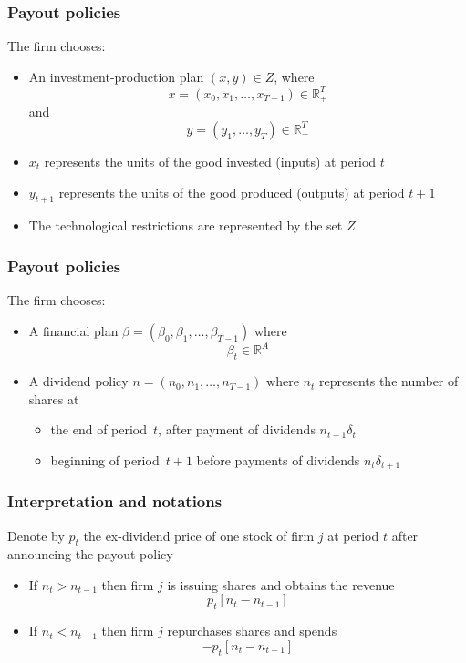 \documentclass[blue]{beamer}
\def\R{\mathbb{R}}
\theoremstyle{definition}
\theoremstyle{example}
\begin{document}

\begin{frame}\frametitle{Payout policies}
The firm chooses:
    \begin{itemize}
    \item An investment-production plan $(x,y) \in Z$, where
    \[
    x=(x_0,x_1,\ldots,x_{T-1}) \in \R_+^T
    \]
    and
    \[
    y=(y_1,\ldots,y_{T}) \in \R_+^T
    \]
    \item $x_t$ represents the units of the good invested (inputs) at period $t$
    \item $y_{t+1}$ represents the units of the good produced (outputs) at period $t+1$
    \item The technological restrictions are represented by the set $Z$
    \end{itemize}

\end{frame}


\begin{frame}\frametitle{Payout policies}
The firm chooses:
    \begin{itemize}
    \item A financial plan $\beta=(\beta_0,\beta_1,\ldots,\beta_{T-1})$ where
    \[
    \beta_t \in \R^A
    \]
    \item A dividend policy $n=(n_0,n_1,\ldots,n_{T-1})$ where $n_t$ represents the number of shares at
        \begin{itemize}
        \item the end of period~$t$, after payment of dividends $n_{t-1} \delta_t$
        \item beginning of period~$t+1$ before payments of dividends $n_t \delta_{t+1}$
        \end{itemize}
    \end{itemize}


\end{frame}


\begin{frame}\frametitle{Interpretation and notations}

Denote by $p_t$ the \alert{ex-dividend} price of one stock of firm $j$ at period $t$ \alert{after announcing the payout policy}

\begin{itemize}
\item If $n_t > n_{t-1}$ then firm $j$ is issuing shares and obtains the revenue $$p_t [n_t - n_{t-1}]$$
\item If $n_t < n_{t-1}$ then firm $j$ repurchases shares and spends $$-p_t [n_t - n_{t-1}]$$
\end{itemize}
\end{frame}
\end{document}
